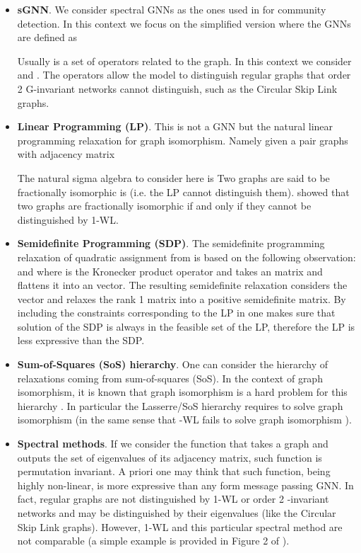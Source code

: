 \documentclass{article}
\begin{document}
\begin{itemize}
\item \textbf{sGNN}. We consider spectral GNNs as the ones used in \cite{chen2019cdsbm} for community detection. In this context we focus on the simplified version where the GNNs are defined as

Usually  is a set of operators related to the graph. In this context we consider  and . The operators  allow the model to distinguish regular graphs that order 2 G-invariant networks cannot distinguish, such as the Circular Skip Link graphs. 
\item \textbf{Linear Programming (LP)}. This is not a GNN but the natural linear programming relaxation for graph isomorphism. Namely given a pair graphs with adjacency matrix  
 
The natural sigma algebra to consider here is 
Two graphs are said to be fractionally isomorphic is  (i.e. the LP cannot distinguish them). \cite{ramana1994fractional} showed that two graphs are fractionally isomorphic if and only if they cannot be distinguished by 1-WL. 
\item \textbf{Semidefinite Programming (SDP)}. The semidefinite programming relaxation of quadratic assignment from \cite{zhao1998semidefinite} is based on the following observation:  and  where  is the Kronecker product operator and  takes an  matrix and flattens it into an  vector. The resulting semidefinite relaxation considers the vector  and relaxes the rank 1 matrix  into a positive semidefinite matrix. By including the constraints corresponding to the LP in  one makes sure that solution of the SDP is always in the feasible set of the LP, therefore the LP is less expressive than the SDP.
\item \textbf{Sum-of-Squares (SoS) hierarchy}. One can consider the hierarchy of relaxations coming from sum-of-squares (SoS). In the context of graph isomorphism, it is known that graph isomorphism is a hard problem for this hierarchy \cite{o2014hardness}. In particular the Lasserre/SoS hierarchy requires  to solve graph isomorphism (in the same sense that -WL fails to solve graph isomorphism \cite{cai1992optimal}).
\item \textbf{Spectral methods}. If we consider the function that takes a graph and outputs the set of eigenvalues of its adjacency matrix, such function is permutation invariant. A priori one may think that such function, being highly non-linear, is more expressive than any form message passing GNN. In fact, regular graphs are not distinguished by 1-WL or order 2 -invariant networks and may be distinguished by their eigenvalues (like the Circular Skip Link graphs). However, 1-WL and this particular spectral method are not comparable (a simple example is provided in Figure 2 of \cite{ramana1994fractional}). 
\end{itemize}
\end{document}

